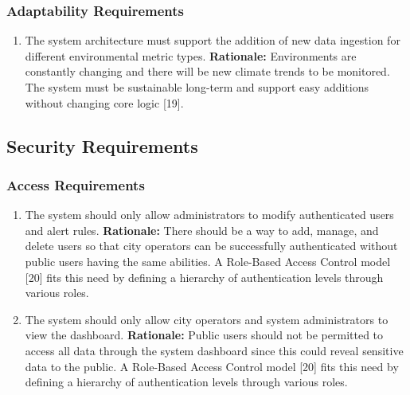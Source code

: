 \documentclass[]{article}
\begin{document}
\subsubsection{Adaptability Requirements}
\label{ssub:adaptability_requirements}
\begin{enumerate}[{MS-A}1. ]
	\item The system architecture must support the addition of new data ingestion for different environmental metric types.\newline
	{\bf Rationale:} Environments are constantly changing and there will be new climate trends to be monitored. The system must be sustainable long-term and support easy additions without changing core logic [19].
\end{enumerate}


\subsection{Security Requirements}
\label{sub:security_requirements}

\subsubsection{Access Requirements}
\label{ssub:access_requirements}
\begin{enumerate}[{SR-AC}1. ]
	\item The system should only allow administrators to modify authenticated users and alert rules.\newline
	{\bf Rationale:} There should be a way to add, manage, and delete users so that city operators can be successfully authenticated without public users having the same abilities. A Role-Based Access Control model [20] fits this need by defining a hierarchy of authentication levels through various roles.
	\item The system should only allow city operators and system administrators to view the dashboard.\newline
	{\bf Rationale:} Public users should not be permitted to access all data through the system dashboard since this could reveal sensitive data to the public. A Role-Based Access Control model [20] fits this need by defining a hierarchy of authentication levels through various roles.
\end{enumerate}
\end{document}
